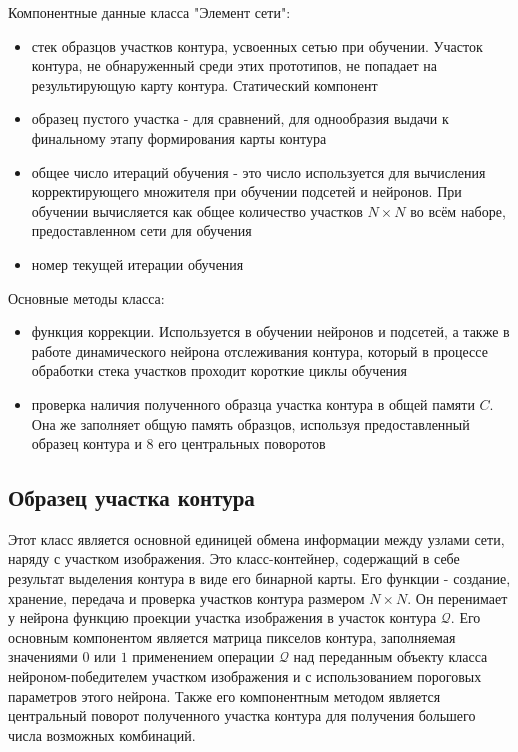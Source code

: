 \documentclass[a4paper,12pt]{report}
\begin{document}
Компонентные данные класса "Элемент сети":
\begin{itemize}
\item{стек образцов участков контура, усвоенных сетью при обучении. Участок контура, не обнаруженный среди этих прототипов, не попадает на результирующую карту контура. Статический компонент}
\item{образец пустого участка - для сравнений, для однообразия выдачи к финальному этапу формирования карты контура}
\item{общее число итераций обучения - это число используется для вычисления корректирующего множителя при обучении подсетей и нейронов. При обучении вычисляется как общее количество участков $N\times N$ во всём наборе, предоставленном сети для обучения}
\item{номер текущей итерации обучения}
\end{itemize}

Основные методы класса:
\begin{itemize}
\item{функция коррекции. Используется в обучении нейронов и подсетей, а также в работе динамического нейрона отслеживания контура, который в процессе обработки стека участков проходит короткие циклы обучения}
\item{проверка наличия полученного образца участка контура в общей памяти $C$. Она же заполняет общую память образцов, используя предоставленный образец контура и 8 его центральных поворотов}
\end{itemize}

\subsection{Образец участка контура}
Этот класс является основной единицей обмена информации между узлами сети, наряду с участком изображения. Это класс-контейнер, содержащий в себе результат выделения контура в виде его бинарной карты. Его функции - создание, хранение, передача и проверка участков контура размером $N\times N$. Он перенимает у нейрона функцию проекции участка изображения в участок контура $\mathcal{Q}$. Его основным компонентом является матрица пикселов контура, заполняемая значениями $0$ или $1$ применением операции $\mathcal{Q}$ над переданным объекту класса нейроном-победителем участком изображения и с использованием пороговых параметров этого нейрона. Также его компонентным методом является центральный поворот полученного участка контура для получения большего числа возможных комбинаций.
\end{document}
